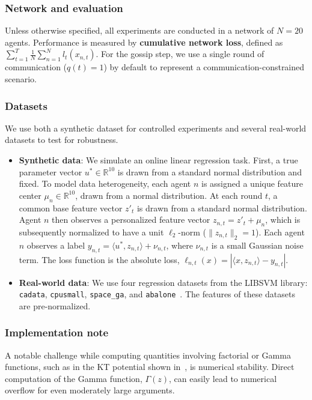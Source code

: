 \documentclass[journal]{IEEEtran} %
\begin{document}
\subsubsection*{Network and evaluation}
Unless otherwise specified, all experiments are conducted in a network of $N=20$ agents.
Performance is measured by \textbf{cumulative network loss}, defined as $\sum_{t=1}^{T} \frac{1}{N} \sum_{n=1}^{N} l_{t}(x_{n,t})$.
For the gossip step, we use a single round of communication ($q(t)=1$) by default to represent a communication-constrained scenario.

\subsubsection*{Datasets}
We use both a synthetic dataset for controlled experiments and several real-world datasets to test for robustness.
\begin{itemize}
    \item \textbf{Synthetic data}: We simulate an online linear regression task.
          First, a true parameter vector $u^* \in \mathbb{R}^{10}$ is drawn from a standard normal distribution and fixed.
          To model data heterogeneity, each agent $n$ is assigned a unique feature center $\mu_n \in \mathbb{R}^{10}$, drawn from a normal distribution.
          At each round $t$, a common base feature vector $z'_t$ is drawn from a standard normal distribution.
          Agent $n$ then observes a personalized feature vector $z_{n,t} = z'_t + \mu_n$, which is subsequently normalized to have a unit $\ell_2$-norm ($\|z_{n,t}\|_2 = 1$).
          Each agent $n$ observes a label $y_{n,t} = \langle u^*, z_{n,t} \rangle + \nu_{n,t}$, where $\nu_{n,t}$ is a small Gaussian noise term.
          The loss function is the absolute loss, $\ell_{n,t}(x) = |\langle x, z_{n,t} \rangle - y_{n,t}|$.
    \item \textbf{Real-world data}: We use four regression datasets from the LIBSVM library: \texttt{cadata}, \texttt{cpusmall}, \texttt{space\_ga}, and \texttt{abalone}~\cite{chang_libsvm_2011}.
          The features of these datasets are pre-normalized.
\end{itemize}

\subsubsection*{Implementation note}
A notable challenge while computing quantities involving factorial or Gamma functions, such as in the KT potential shown in~, is numerical stability.
Direct computation of the Gamma function, $\Gamma(z)$, can easily lead to numerical overflow for even moderately large arguments.
\end{document}
